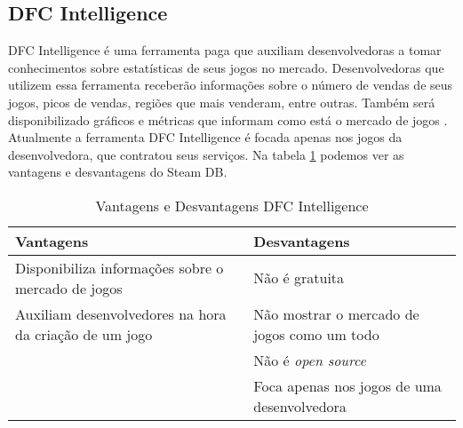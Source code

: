 \subsection{DFC Intelligence}
DFC Intelligence é uma ferramenta paga que auxiliam desenvolvedoras a tomar conhecimentos sobre estatísticas de seus jogos no mercado. Desenvolvedoras que utilizem essa ferramenta receberão informações sobre o número de vendas de seus jogos, picos de vendas, regiões que mais venderam, entre outras. Também será disponibilizado gráficos e métricas que informam como está o mercado de jogos \cite{dfc_intelligence}. Atualmente a ferramenta DFC Intelligence é focada apenas nos jogos da desenvolvedora, que contratou seus serviços. Na tabela \ref{table:dfc_intelligence} podemos ver as vantagens e desvantagens do Steam DB.
\begin{table} [H]
\centering
\begin{tabular}{|p{7cm}|p{7cm}|}
\hline \textbf{Vantagens} & \textbf{Desvantagens} \\
\hline Disponibiliza informações sobre o mercado de jogos & Não é gratuita \\
\hline Auxiliam desenvolvedores na hora da criação de um jogo & Não mostrar o mercado de jogos como um todo \\
\hline & Não é \textit{open source} \\
\hline & Foca apenas nos jogos de uma desenvolvedora \\
\hline
\end{tabular}
\caption{Vantagens e Desvantagens DFC Intelligence}
\label{table:dfc_intelligence}
\end{table}